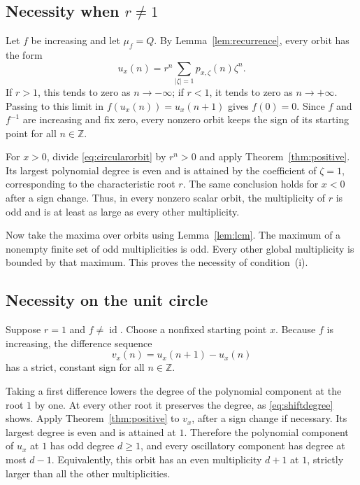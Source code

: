\documentclass[11pt,letterpaper]{article}
\theoremstyle{definition}
\theoremstyle{remark}
\newcommand{\Z}{\mathbb Z}
\newcommand{\id}{\operatorname{id}}
\begin{document}
\subsection{Necessity when \texorpdfstring{$r\ne1$}{r is not 1}}

Let $f$ be increasing and let $\mu_f=Q$. By
Lemma~\ref{lem:recurrence}, every orbit has the form
\begin{equation}
  u_x(n)=r^n\sum_{|\zeta|=1}p_{x,\zeta}(n)\zeta^n.
  \label{eq:circularorbit}
\end{equation}
If $r>1$, this tends to zero as $n\to-\infty$; if $r<1$, it tends to zero
as $n\to+\infty$. Passing to this limit in
$f(u_x(n))=u_x(n+1)$ gives $f(0)=0$.
Since $f$ and $f^{-1}$ are increasing and fix zero, every nonzero orbit
keeps the sign of its starting point for all $n\in\Z$.

For $x>0$, divide \eqref{eq:circularorbit} by $r^n>0$ and apply
Theorem~\ref{thm:positive}. Its largest polynomial degree is even and is
attained by the coefficient of $\zeta=1$, corresponding to the
characteristic root $r$. The same conclusion holds for $x<0$ after a sign
change. Thus, in every nonzero scalar orbit, the multiplicity of $r$ is
odd and is at least as large as every other multiplicity.

Now take the maxima over orbits using Lemma~\ref{lem:lcm}. The maximum of
a nonempty finite set of odd multiplicities is odd. Every other global
multiplicity is bounded by that maximum. This proves the necessity of
condition~(i).

\subsection{Necessity on the unit circle}

Suppose $r=1$ and $f\ne\id$. Choose a nonfixed starting point $x$.
Because $f$ is increasing, the difference sequence
\begin{equation}
  v_x(n)=u_x(n+1)-u_x(n)
  \label{eq:increments}
\end{equation}
has a strict, constant sign for all $n\in\Z$.

Taking a first difference lowers the degree of the polynomial component
at the root $1$ by one. At every other root it preserves the degree,
as \eqref{eq:shiftdegree} shows. Apply Theorem~\ref{thm:positive} to
$v_x$, after a sign change if necessary. Its largest degree is even and
is attained at $1$. Therefore the polynomial component of $u_x$ at $1$
has odd degree $d\ge1$, and every oscillatory component has degree at most
$d-1$. Equivalently, this orbit has an even multiplicity $d+1$ at $1$,
strictly larger than all the other multiplicities.
\end{document}

